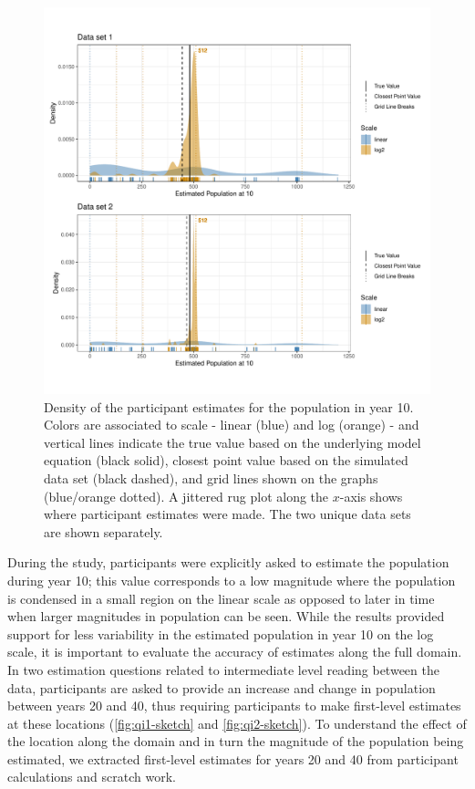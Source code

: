 \documentclass[print]{nuthesis}
\begin{document}
\begin{figure}[tbp]

{\centering \includegraphics[width=1\linewidth,]{thesis_files/figure-latex/qe1-density-plot-10-all-1} 

}

\caption[Elementary Q1 density in year 10]{Density of the participant estimates for the population in year 10. Colors are associated to scale - linear (blue) and log (orange) - and vertical lines indicate the true value based on the underlying model equation (black solid), closest point value based on the simulated data set (black dashed), and grid lines shown on the graphs (blue/orange dotted). A jittered rug plot along the $x$-axis shows where participant estimates were made. The two unique data sets are shown separately.}\label{fig:qe1-density-plot-10-all}
\end{figure}

During the study, participants were explicitly asked to estimate the population during year 10; this value corresponds to a low magnitude where the population is condensed in a small region on the linear scale as opposed to later in time when larger magnitudes in population can be seen.
While the results provided support for less variability in the estimated population in year 10 on the log scale, it is important to evaluate the accuracy of estimates along the full domain.
In two estimation questions related to intermediate level reading between the data, participants are asked to provide an increase and change in population between years 20 and 40, thus requiring participants to make first-level estimates at these locations (\cref{fig:qi1-sketch} and \cref{fig:qi2-sketch}).
To understand the effect of the location along the domain and in turn the magnitude of the population being estimated, we extracted first-level estimates for years 20 and 40 from participant calculations and scratch work.
\end{document}
